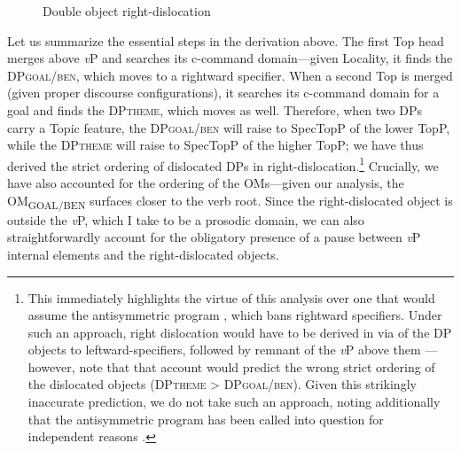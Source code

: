 \documentclass[output=paper,newtxmath,modfonts,nonflat,hidelinks]{langsci/langscibook}
\begin{document}
\newpage 
\begin{figure}
\caption{Double object right-dislocation}
\label{fig:ranero:3}
\end{figure}   

 


Let us summarize the essential steps in the derivation above. The first Top head merges above \textit{v}P and searches its c-command domain—given Locality, it finds the DP\textsc{goal/ben}, which moves to a rightward specifier. When a second Top is merged (given proper discourse configurations), it searches its c-command domain for a goal and finds the DP\textsc{theme}, which moves as well. Therefore, when two DPs carry a Topic feature, the DP\textsc{goal/ben} will raise to SpecTopP of the lower TopP, while the DP\textsc{theme} will raise to SpecTopP of the higher TopP; we have thus derived the strict ordering of dislocated DPs in right-dislocation.\footnote{This immediately highlights the virtue of this analysis over one that would assume the antisymmetric program \citep{kayne1994}, which bans rightward specifiers. Under such an approach, right dislocation would have to be derived in  via  of the DP objects to leftward-specifiers, followed by remnant  of the \textit{v}P above them — however, note that that account would predict the wrong strict ordering of the dislocated objects (DP\textsc{theme} > DP\textsc{goal/ben}). Given this strikingly inaccurate prediction, we do not take such an approach, noting additionally that the antisymmetric program has been called into question for independent reasons \citep{Abels2009}.} Crucially, we have also accounted for the ordering of the OMs—given our analysis, the OM\textsubscript{GOAL/BEN} surfaces closer to the verb root. Since the right-dislocated object is outside the \textit{v}P, which I take to be a prosodic domain, we can also straightforwardly account for the obligatory presence of a pause between \textit{v}P internal elements and the right-dislocated objects.
\end{document}
